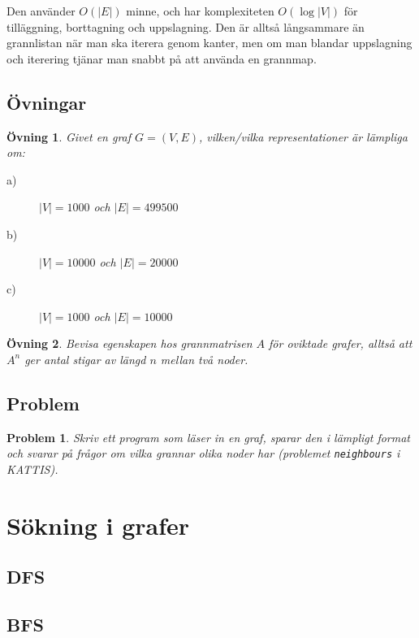 \documentclass[10pt,a4paper]{article}
\theoremstyle{problem}
\newtheorem{problem}{Problem}
\newtheorem{exercise}{Övning}
\begin{document}
Den använder $O(|E|)$ minne, och har komplexiteten $O(\log |V|)$ för tilläggning,
borttagning och uppslagning. Den är alltså långsammare än grannlistan när man ska iterera genom kanter, men om man blandar uppslagning och iterering tjänar
man snabbt på att använda en grannmap.

\subsection{Övningar}
\begin{exercise}
Givet en graf $G = (V, E)$, vilken/vilka representationer är lämpliga om:
\begin{description}
\item[a)]{$|V| = 1000$ och $|E| = 499500$}
\item[b)]{$|V| = 10000$ och $|E| = 20000$}
\item[c)]{$|V| = 1000$ och $|E| = 10000$}
\end{description}
\end{exercise}
\begin{exercise}
Bevisa egenskapen hos grannmatrisen $A$ för oviktade grafer, alltså att $A^n$ ger antal stigar av längd $n$ mellan två noder.
\end{exercise}
\subsection{Problem}
\begin{problem}
Skriv ett program som läser in en graf, sparar den i lämpligt format och svarar på frågor om vilka grannar olika noder har (problemet \texttt{neighbours} i KATTIS).
\end{problem}

\section{Sökning i grafer}
\subsection{DFS}
\subsection{BFS}
\end{document}

